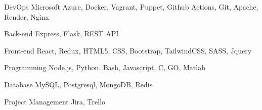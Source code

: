 
\begin{cvskills}

  \cvskill
  {DevOps} %
  {Microsoft Azure, Docker, Vagrant, Puppet, Github Actions, Git, Apache, Render, Nginx} %

  \cvskill
  {Back-end} %
  {Express, Flask, REST API} %

  \cvskill
  {Front-end} %
  {React, Redux, HTML5, CSS, Bootstrap, TailwindCSS, SASS, Jquery}

  \cvskill
  {Programming} %
  {Node.js, Python, Bash, Javascript, C, GO, Matlab} %

  \cvskill
  {Database} %
  {MySQL, Postgresql, MongoDB, Redis} %

  \cvskill
  {Project Management} %
  {Jira, Trello} %

\end{cvskills}
